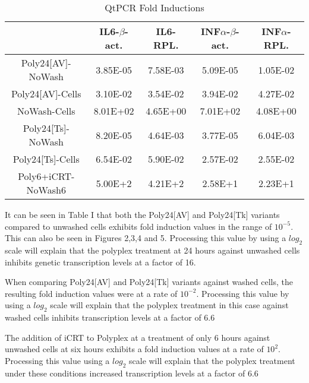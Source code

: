 \documentclass[journal, a4paper]{IEEEtran}
\begin{document}
    \begin{table}[!hbt]
      \begin{center}
      \caption{QtPCR Fold Inductions}
      \label{tab:simParameters}
      \begin{tabular}{|c|c|c|c|c|}
        \hline
        & IL6-$\beta$-act. & IL6-RPL. & INF$\alpha$-$\beta$-act. & INF$\alpha$-RPL. \\
        \hline
        Poly24[AV]-NoWash & 3.85E-05 & 7.58E-03 & 5.09E-05 & 1.05E-02 \\
        \hline
        Poly24[AV]-Cells & 3.10E-02 & 3.54E-02 & 3.94E-02 & 4.27E-02 \\
        \hline
        NoWash-Cells & 8.01E+02 & 4.65E+00 & 7.01E+02 & 4.08E+00 \\
        \hline
        Poly24[Ts]-NoWash & 8.20E-05 & 4.64E-03 & 3.77E-05 & 6.04E-03\\
        \hline
        Poly24[Ts]-Cells & 6.54E-02 & 5.90E-02 & 2.57E-02 & 2.55E-02\\
        \hline
        Poly6+iCRT-NoWash6 & 5.00E+2 & 4.21E+2 & 2.58E+1 & 2.23E+1 \\
        \hline
      \end{tabular}
      \end{center}
    \end{table}


    It can be seen in Table I that both the Poly24[AV] and Poly24[Tk] variants compared to unwashed cells
    exhibits fold induction values in the range of $10^{-5}$. This can also be seen in Figures 2,3,4 and 5.
    Processing this value by using a $log_2$ scale will explain that the polyplex treatment at 24 hours
    against unwashed cells inhibits genetic transcription levels at a factor of 16.

    When comparing Poly24[AV] and Poly24[Tk] variants against washed cells,
    the resulting fold induction values were at a rate of $10^{-2}$. Processing this value
    by using a $log_2$ scale will explain that the polyplex treatment
    in this case against washed cells inhibits transcription levels at a factor of 6.6

    The addition of iCRT to Polyplex at a treatment of only 6 hours against unwashed
    cells at six hours exhibits a fold induction values at a rate of $10^2$. Processing
    this value using a $log_2$ scale will explain that the polyplex treatment under these
    conditions increased transcription levels at a factor of 6.6
\end{document}
